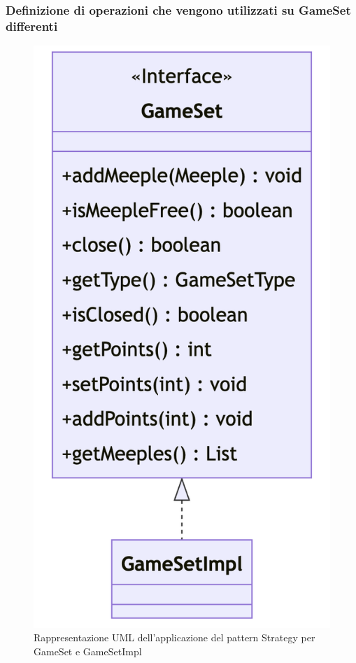 \subsubsection*{Definizione di operazioni che vengono utilizzati su GameSet differenti}
\begin{figure}[ht]
    \centering\includegraphics[scale=.4]{images/gameset.png}
    \caption{Rappresentazione UML dell'applicazione del pattern Strategy per GameSet e GameSetImpl}
\end{figure}
